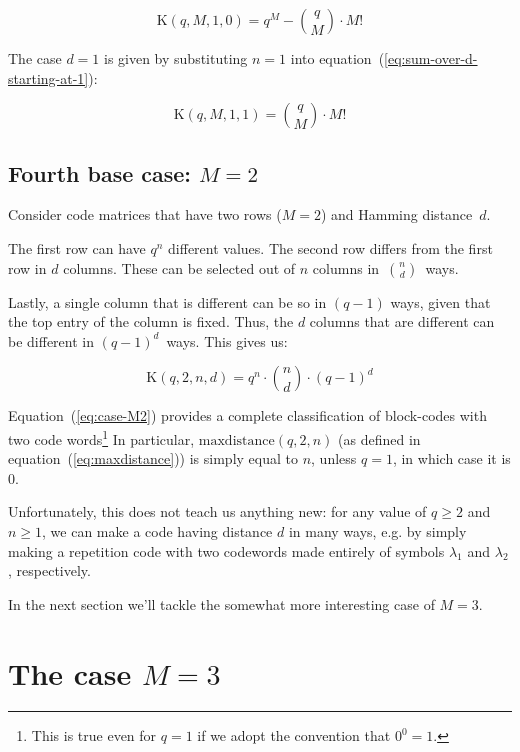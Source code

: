 \documentclass[a4paper]{article}
\newcommand{\codecount}{\mathrm{K}}
\newcommand{\maxdistance}{\mathrm{maxdistance}}
\begin{document}
\begin{equation}
\codecount(q, M, 1, 0) = q^M - \binom{q}{M} \cdot M!
\label{eq:case-n1d0}
\end{equation}

The case $d=1$ is given by substituting $n=1$ into equation~(\ref{eq:sum-over-d-starting-at-1}):

\begin{equation}
\codecount(q, M, 1, 1) = \binom{q}{M} \cdot M!
\label{eq:case-n1d1}
\end{equation}


\subsection{Fourth base case: $M=2$}

Consider code matrices that have two rows ($M=2$) and Hamming distance~$d$.

The first row can have $q^n$ different values.
The second row differs from the first row in $d$ columns.
These can be selected out of $n$ columns in~$\binom{n}{d}$~ways.

Lastly, a single column that is different can be so in $(q-1)$ ways, given that the top entry of the column is fixed.
Thus, the $d$ columns that are different can be different in $(q-1)^d$~ways.
This gives us:

\begin{equation}
\codecount(q, 2, n, d) = q^n \cdot \binom{n}{d} \cdot (q-1)^d
\label{eq:case-M2}
\end{equation}

Equation~(\ref{eq:case-M2}) provides a complete classification of block-codes with two code words\footnote{This is true even for $q=1$ if we adopt the
convention that $0^0=1$.} In particular, $\maxdistance(q,2,n)$ (as defined in equation~(\ref{eq:maxdistance})) is simply equal to $n$, unless $q=1$, in which case it is $0$.

Unfortunately, this does not teach us anything new: for any value of $q \ge 2$ and $n \ge 1$,
we can make a code having distance $d$ in many ways, e.g. by simply making a repetition code with two codewords made entirely of symbols $\lambda_1$ and $\lambda_2$, respectively.

In the next section we'll tackle the somewhat more interesting case of $M=3$.

\section{The case $M=3$}
\label{sec:case-M3}
\end{document}
